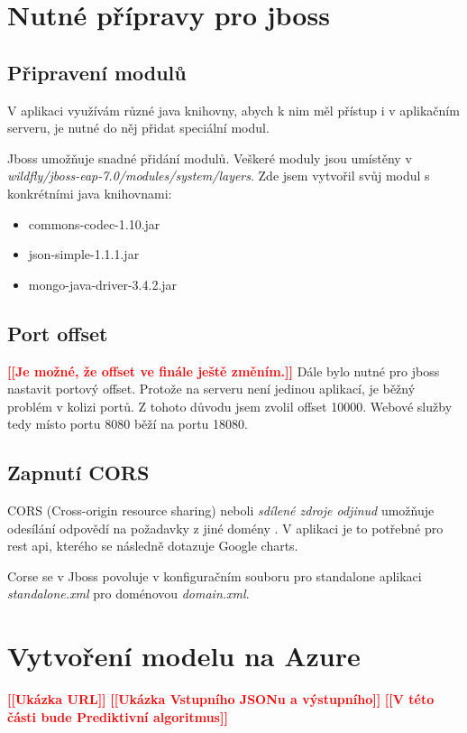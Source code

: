 \documentclass[thesis=M,czech]{FITthesis}[2012/10/20]
\newcommand{\todo}[1]{\textcolor{red}{\textbf{[[#1]]}}}
\begin{document}
	\section{Nutné přípravy pro jboss}
		\subsection{Připravení modulů}
		V aplikaci využívám různé java knihovny, abych k nim měl přístup i v aplikačním serveru, je nutné do něj přidat speciální modul.
		
		Jboss umožňuje snadné přidání modulů. Veškeré moduly jsou umístěny v \textit{wildfly/jboss-eap-7.0/modules/system/layers}. Zde jsem vytvořil svůj modul s konkrétními java knihovnami:
		\begin{itemize} 
			\item commons-codec-1.10.jar
			\item json-simple-1.1.1.jar
			\item mongo-java-driver-3.4.2.jar		
		\end{itemize}
		
		\subsection{Port offset}
		\todo{Je možné, že offset ve finále ještě změním.}
		Dále bylo nutné pro jboss nastavit portový offset. Protože na serveru není jedinou aplikací, je běžný problém v kolizi portů. Z tohoto důvodu jsem zvolil offset 10000. Webové služby tedy místo portu 8080 běží na portu 18080.
		
		\subsection{Zapnutí CORS}
		CORS (Cross-origin resource sharing) neboli \textit{sdílené zdroje odjinud} umožňuje odesílání odpovědí na požadavky z jiné domény \cite{CORS}. V aplikaci je to potřebné pro rest api, kterého se následně dotazuje Google charts.
		
		Corse se v Jboss povoluje v konfiguračním souboru pro standalone aplikaci \textit{standalone.xml} pro doménovou \textit{domain.xml}.
		
	
	\section{Vytvoření modelu na Azure}
		\todo{Ukázka URL}
		\todo{Ukázka Vstupního JSONu a výstupního}
		\todo{V této části bude Prediktivní algoritmus}
\end{document}
